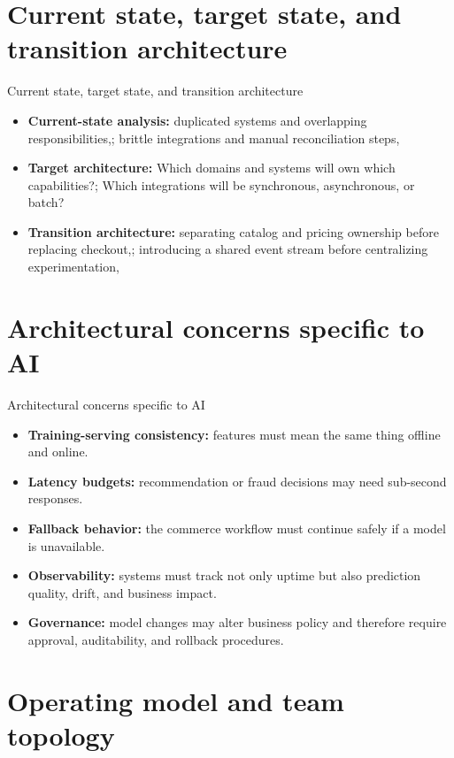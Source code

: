 \documentclass[aspectratio=169]{beamer}
\begin{document}
\section{Current state, target state, and transition architecture}

\begin{frame}{Current state, target state, and transition architecture}
  \begin{itemize}
    \item \textbf{Current-state analysis:} duplicated systems and overlapping responsibilities,; brittle integrations and manual reconciliation steps,
    \item \textbf{Target architecture:} Which domains and systems will own which capabilities?; Which integrations will be synchronous, asynchronous, or batch?
    \item \textbf{Transition architecture:} separating catalog and pricing ownership before replacing checkout,; introducing a shared event stream before centralizing experimentation,
  \end{itemize}
\end{frame}

\section{Architectural concerns specific to AI}

\begin{frame}{Architectural concerns specific to AI}
  \begin{itemize}
    \item \textbf{Training-serving consistency:} features must mean the same thing offline and online.
    \item \textbf{Latency budgets:} recommendation or fraud decisions may need sub-second responses.
    \item \textbf{Fallback behavior:} the commerce workflow must continue safely if a model is unavailable.
    \item \textbf{Observability:} systems must track not only uptime but also prediction quality, drift, and business impact.
    \item \textbf{Governance:} model changes may alter business policy and therefore require approval, auditability, and rollback procedures.
  \end{itemize}
\end{frame}

\section{Operating model and team topology}
\end{document}
